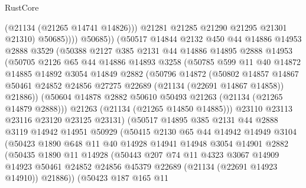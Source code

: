 \begin{lexlean}{RustCore}
\begin{coremodule}
                      (@21134 (@21265 @14741 @14826)))
                    @21281
                    @21285
                    @21290
                    @21295
                    @21301
                    @21310)
                  @50685))))
          @50685))
      (@50517
        @14844
        @2132
        @450
        @44
        @14886
        @14953
        @2888
        @3529
        (@50388
          @2127
          @385
          @2131
          @44
          @14886
          @14895
          @2888
          @14953
          (@50705
            @2126
            @65
            @44
            @14886
            @14893
            @3258
            (@50785
              @599
              @11
              @40
              @14872
              @14885
              @14892
              @3054
              @14849
              @2882
              (@50796
                @14872
                (@50802
                  @14857
                  @14867
                  @50461
                  @24852
                  @24856
                  @27275
                  @22689
                  (@21134 (@22691 @14867 @14858))
                  @21886))
              (@50604 @14878 @2882 @50610 @50493 @21263 (@21134 (@21265 @14879 @2888)))
              @21263
              (@21134 (@21265 @14850 @14885)))
            @23110
            @23113
            @23116
            @23120
            @23125
            @23131)
          (@50517
            @14895
            @385
            @2131
            @44
            @2888
            @3119
            @14942
            @14951
            @50929
            (@50415
              @2130
              @65
              @44
              @14942
              @14949
              @3104
              (@50423
                @1890
                @648
                @11
                @40
                @14928
                @14941
                @14948
                @3054
                @14901
                @2882
                (@50435
                  @1890
                  @11
                  @14928
                  (@50443
                    @207
                    @74
                    @11
                    @4323
                    @3067
                    @14909
                    @14923
                    @50461
                    @24852
                    @24856
                    @45379
                    @22689
                    (@21134 (@22691 @14923 @14910))
                    @21886))
                (@50423
                  @187
                  @165
                  @11

\end{coremodule}
\end{lexlean}
